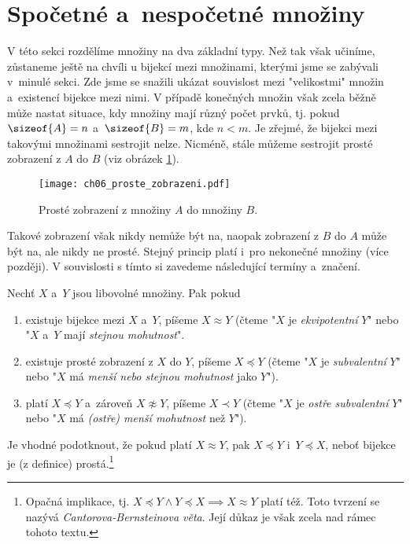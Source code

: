 \section{Spočetné a~nespočetné množiny}\label{sec:spocetne_a_nespocetne_mnoziny}
V této sekci rozdělíme množiny na dva základní typy. Než tak však učiníme, zůstaneme ještě na chvíli u bijekcí mezi množinami, kterými jsme se zabývali v~minulé sekci. Zde jsme se snažili ukázat souvislost mezi "velikostmi" množin a~existencí bijekce mezi nimi. V případě konečných množin však zcela běžně může nastat situace, kdy množiny mají různý počet prvků, tj. pokud $\sizeof{A}=n$ a~$\sizeof{B}=m$, kde $n<m$. Je zřejmé, že bijekci mezi takovými množinami sestrojit nelze. Nicméně, stále můžeme sestrojit prosté zobrazení z $A$ do $B$ (viz obrázek \ref{fig:proste_zobrazeni_A_do_B}).
\begin{figure}[H]
    \centering
    \texttt{[image: ch06\_proste\_zobrazeni.pdf]}
    \caption{Prosté zobrazení z množiny $A$ do množiny $B$.}
    \label{fig:proste_zobrazeni_A_do_B}
\end{figure}
Takové zobrazení však nikdy nemůže být na, naopak zobrazení z $B$ do $A$ může být na, ale nikdy ne prosté. Stejný princip platí i~pro nekonečné množiny (více později). V souvislosti s tímto si zavedeme následující termíny a~značení.
\begin{definition}\label{def:subvalence_a_ekvipotence}
    Nechť $X$ a~$Y$ jsou libovolné množiny. Pak pokud
    \begin{enumerate}[label=(\roman*)]
        \item existuje bijekce mezi $X$ a~$Y$, píšeme $X\approx Y$ (čteme "$X$ je \emph{ekvipotentní} $Y$" nebo "$X$ a~$Y$ mají \emph{stejnou mohutnost}".
        \item existuje prosté zobrazení z $X$ do $Y$, píšeme $X\preccurlyeq Y$ (čteme "$X$ je \emph{subvalentní} $Y$" nebo "$X$ má \emph{menší nebo stejnou mohutnost} jako $Y$").
        \item platí $X\preccurlyeq Y$ a~zároveň $X\napprox Y$, píšeme $X\prec Y$ (čteme "$X$ je \emph{ostře subvalentní} $Y$" nebo "$X$ má \emph{(ostře) menší mohutnost} než $Y$").
    \end{enumerate}
\end{definition}
Je vhodné podotknout, že pokud platí $X\approx Y$, pak $X\preccurlyeq Y$ i~$Y\preccurlyeq X$, neboť bijekce je (z definice) prostá.\footnote{Opačná implikace, tj. $X\preccurlyeq Y \land Y\preccurlyeq X\implies X\approx Y$ platí též. Toto tvrzení se nazývá \emph{Cantorova-Bernsteinova věta}. Její důkaz je však zcela nad rámec tohoto textu.}\par
